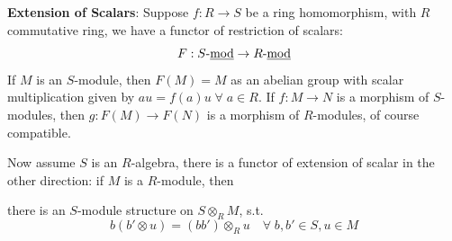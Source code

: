 \begin{eg}
	\textbf{Extension of Scalars}: Suppose \( f: R\to S \) be a ring homomorphism, with \( R \)
	commutative ring, we have a functor of restriction of scalars:
	\[
		F: S\text{-\underline{mod}} \to R\text{-\underline{mod}}
	\]
	If \( M \) is an \( S \)-module, then \( F(M) = M \) as an abelian group with scalar
	multiplication given by \( au = f(a)u \; \forall \; a\in R \). If \( f: M \to N \) is a morphism
	of \( S \)-modules, then \( g: F(M) \to F(N) \) is a morphism of \( R \)-modules, of course
	compatible.

	Now assume \( S \) is an \( R \)-algebra, there is a functor of extension of scalar in the other
	direction: if \( M \) is a \( R \)-module, then
	\begin{claim}
		there is an \( S \)-module structure on \( S\otimes_R M \), s.t.
		\[
			b(b'\otimes u) = (bb') \otimes_R u \quad \forall \; b,b'\in S, u\in M
		\]
	\end{claim}


\end{eg}
